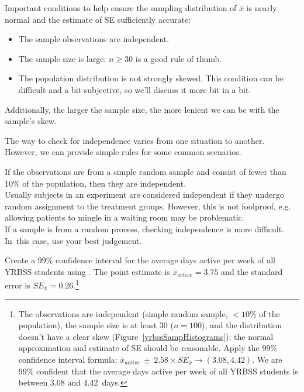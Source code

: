 \begin{termBox}{
Important conditions to help ensure the sampling distribution of $\bar{x}$ is nearly normal and the estimate of SE sufficiently accurate:
\begin{itemize}
\setlength{\itemsep}{0mm}
\item The sample observations are independent.
\item The sample size is large: $n\geq30$ is a good rule of thumb.
\item The population distribution is not strongly skewed. This condition can be difficult and a bit subjective, so we'll discuss it more bit in a bit.
\end{itemize}
Additionally, the larger the sample size, the more lenient we can be with the sample's skew.}
\end{termBox}

The way to check for independence varies from one situation to another. However, we can provide simple rules for some common scenarios.

\begin{tipBox}{
If the observations are from a simple random sample and consist of fewer than 10\% of the population, then they are independent.\\[2mm]
Usually subjects in an experiment are considered independent if they undergo random assignment to the treatment groups. However, this is not foolproof, e.g. allowing patients to mingle in a waiting room may be problematic. \\[2mm]
If a sample is from a random process, checking independence is more difficult. In~this case, use your best judgement.}
\end{tipBox}


\begin{exercise} \label{find99CIForYrbssAgeExercise}
Create a 99\% confidence interval for the average days active per week of all YRBSS students using . The point estimate is $\bar{x}_{active} = 3.75$ and the standard error is $SE_{\bar{x}} = 0.26$.\footnote{The observations are independent (simple random sample, $<10\%$ of the population), the sample size is at least 30 ($n = 100$), and the distribution doesn't have a clear skew (Figure~\ref{yrbssSampHistograms}); the normal approximation and estimate of SE should be reasonable. Apply the 99\% confidence interval formula: $\bar{x}_{active}\ \pm\ 2.58 \times  SE_{\bar{x}} \rightarrow (3.08, 4.42)$. We are 99\% confident that the average days active per week of all YRBSS students is between 3.08 and 4.42~days.}
\end{exercise}

